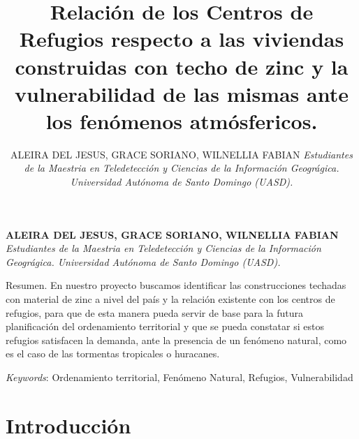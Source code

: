 \documentclass[11pt,]{article}
\title{Relación de los Centros de Refugios respecto a las viviendas construidas
con techo de zinc y la vulnerabilidad de las mismas ante los fenómenos
atmósfericos.  }
\author{\Large ALEIRA DEL JESUS, GRACE SORIANO, WILNELLIA FABIAN\vspace{0.05in} \newline\normalsize\emph{Estudiantes de la Maestria en Teledetección y Ciencias de la Información
Geográgica. Universidad Autónoma de Santo Domingo (UASD).}  }
\date{}
\newcommand*{\authorfont}{\fontfamily{phv}\selectfont}
\renewenvironment{abstract}
 {{%
    \setlength{\leftmargin}{0mm}
    \setlength{\rightmargin}{\leftmargin}%
  }%
  \relax}
 {\endlist}
\begin{document}
	
%

{%
\setlength{\parindent}{0pt}
\thispagestyle{plain}
{\fontsize{18}{20}\selectfont\raggedright 
\maketitle  %

}

{
   \vskip 13.5pt\relax \normalsize\fontsize{11}{12} 
\textbf{\authorfont ALEIRA DEL JESUS, GRACE SORIANO, WILNELLIA FABIAN} \hskip 15pt \emph{\small Estudiantes de la Maestria en Teledetección y Ciencias de la Información
Geográgica. Universidad Autónoma de Santo Domingo (UASD).}   

}

}








\begin{abstract}

    \hbox{\vrule height .2pt width 39.14pc}

    \vskip 8.5pt %

\noindent Resumen. En nuestro proyecto buscamos identificar las construcciones
techadas con material de zinc a nivel del país y la relación existente
con los centros de refugios, para que de esta manera pueda servir de
base para la futura planificación del ordenamiento territorial y que se
pueda constatar si estos refugios satisfacen la demanda, ante la
presencia de un fenómeno natural, como es el caso de las tormentas
tropicales o huracanes.


\vskip 8.5pt \noindent \emph{Keywords}: Ordenamiento territorial, Fenómeno Natural, Refugios, Vulnerabilidad \par

    \hbox{\vrule height .2pt width 39.14pc}



\end{abstract}


\vskip 6.5pt


\noindent  \section{Introducción}\label{introducciuxf3n}
\end{document}
